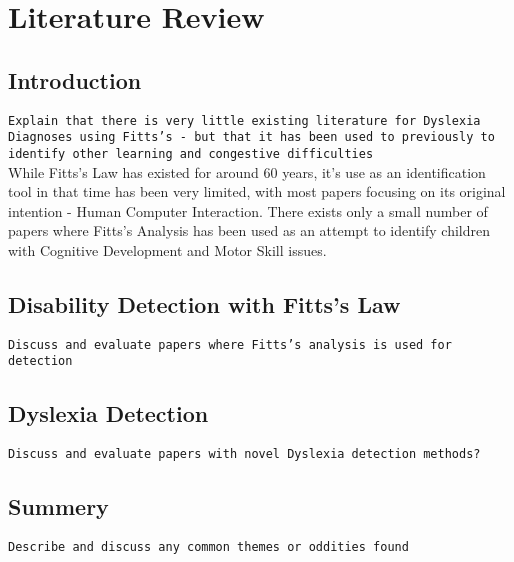 \section{Literature Review}
	\subsection{Introduction}
		\texttt{Explain that there is very little existing literature for Dyslexia Diagnoses using Fitts's - but that it has been used to previously to identify other learning and congestive difficulties}\\
		While Fitts's Law has existed for around 60 years, it's use as an identification tool in that time has been very limited, with most papers focusing on its original intention - Human Computer Interaction. There exists only a small number of papers where Fitts's Analysis has been used as an attempt to identify children with Cognitive Development and Motor Skill issues.
	
	\subsection{Disability Detection with Fitts's Law}
		\texttt{Discuss and evaluate papers where Fitts's analysis is used for detection}
		
	\subsection{Dyslexia Detection}
		\texttt{Discuss and evaluate papers with novel Dyslexia detection methods?}
			
	\subsection{Summery}
		\texttt{Describe and discuss any common themes or oddities found}
		
\newpage